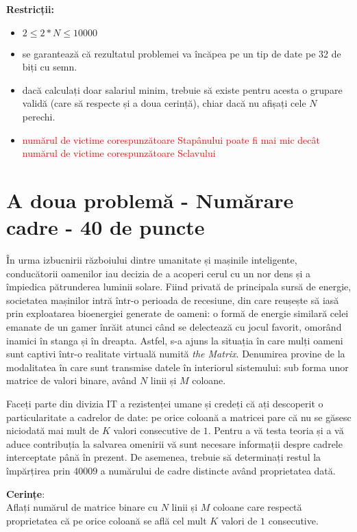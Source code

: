 \documentclass[a4paper,5pt]{article}
\begin{document}
\textbf{Restricții:}
\begin{itemize}
	\item $2 \le 2*N \le 10 000$
	\item se garantează că rezultatul problemei va încăpea pe un tip de date pe
	32 de biți cu semn.
	\item dacă calculați doar salariul minim, trebuie să existe pentru acesta o
	grupare validă (care să respecte și a doua cerință), chiar dacă nu afișați cele $N$ perechi.
	\item \textcolor{red}{numărul de victime corespunzătoare Stapânului poate fi mai mic 
	decât numărul de victime corespunzătoare Sclavului}
\end{itemize}

\indent
\newpage
\normalsize


\section{A doua problemă - Numărare cadre - 40 de puncte}

În urma izbucnirii războiului dintre umanitate și mașinile inteligente,
conducătorii oamenilor iau decizia de a acoperi cerul cu un nor dens
și a împiedica pătrunderea luminii solare. Fiind privată de principala sursă de
energie, societatea mașinilor intră într-o perioada de recesiune, din care
reușește să iasă prin exploatarea bioenergiei generate de oameni: o formă de
energie similară celei emanate de un gamer înrăit atunci când se delectează cu
jocul favorit, omorând inamici în stanga și în dreapta. Astfel, s-a ajuns la
situația în care mulți oameni sunt captivi într-o realitate virtuală numită
\textit{the Matrix}. Denumirea provine de la modalitatea în care sunt transmise
datele în interiorul sistemului: sub forma unor matrice de valori binare, având
$N$ linii și $M$ coloane.

Faceți parte din divizia IT a rezistenței umane și credeți că ați descoperit o
particularitate a cadrelor de date: pe orice coloană a matricei pare că nu se
găsesc niciodată mai mult de $K$ valori consecutive de $1$. Pentru a vă testa
teoria și a vă aduce contribuția la salvarea omenirii vă sunt necesare
informații despre cadrele interceptate până în prezent. De asemenea, trebuie
să determinați restul la împărțirea prin $40009$ a numărului de cadre
distincte având proprietatea dată.

\textbf{Cerințe}: \\
Aflați numărul de matrice binare cu $N$ linii și $M$ coloane care respectă
proprietatea că pe orice coloană se află cel mult $K$ valori de $1$ consecutive.
\end{document}
